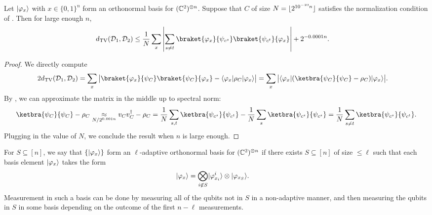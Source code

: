 \begin{lemma}\label{lem:distinguishing probability operator diff meghal}
    Let $\lvert\varphi_x\rangle$ with $x\in\{0,1\}^n$ form an orthonormal basis for $(\mathbb{C}^2)^{\otimes n}$. Suppose that $C$ of size $N={\left\lfloor \smash{2^{10^{-10}n}} \right\rfloor}$ satisfies the normalization condition of . Then for large enough $n$,
    \begin{align*}
        d_{\mathrm{TV}}(\calD_1,\calD_2) &\leq \frac1{N}\sum_{x}\abs{\sum_{s\neq t}\braket{\phi_x}{\smash{\psi_{c^s}}}\braket{\smash{\psi_{c^t}}}{\phi_x}} + 2^{-0.00 01n}.
    \end{align*}
\end{lemma}
\begin{proof}
    We directly compute
    \begin{align*}
        2d_{\mathrm{TV}}(\calD_1,\calD_2) &= \sum_x\abs{\braket{\phi_x}{\psi_C}\braket{\psi_C}{\phi_x}-\bra{\phi_x}\rho_C\ket{\phi_x}}=\sum_x\abs{{\bra{\phi_x}(\ketbra{\psi_C}{\psi_C}-\rho_C)\ket{\phi_x}}}.
    \end{align*}
    By , we can approximate the matrix in the middle up to spectral norm:
    \begin{align*}
        \ketbra{\psi_C}{\psi_C}-\rho_C \underset{N/2^{0.001n}}{\approx}v_Cv_C^\dag -\rho_C=\frac1{N}\sum_{s,t}\ketbra{\smash{\psi_{c^s}}}{\smash{\psi_{c^t}}}-\frac1{N}\sum_{s}\ketbra{\smash{\psi_{c^s}}}{\smash{\psi_{c^s}}}=\frac1{N}\sum_{s\neq t}\ketbra{\smash{\psi_{c^s}}}{\smash{\psi_{c^t}}}.
    \end{align*}
    Plugging in the value of $N$, we conclude the result when $n$ is large enough.
\end{proof}

For $S\subseteq[n]$, we say that $\{\lvert\varphi_x\rangle\}$ form an $\ell$-adaptive orthonormal basis for $(\mathbb{C}^2)^{\otimes n}$ if there exists $S\subseteq[n]$ of size $\leq\ell$ such that each basis element $\lvert\varphi_x\rangle$ takes the form 
\begin{align*}
    \lvert\varphi_x\rangle &= \bigotimes_{i\not\in S}\lvert\smash{\varphi^{i}_{x_i}}\rangle \otimes \lvert\varphi_{x_S}\rangle. 
\end{align*}
Measurement in such a basis can be done by measuring all of the qubits not in $S$ in a non-adaptive manner, and then measuring the qubits in $S$ in some basis depending on the outcome of the first $n-\ell$ measurements.

